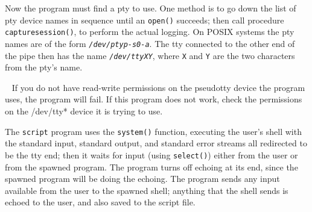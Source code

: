 Now the program must find a pty to use. One method is to go
down the list of pty device names in sequence until an
\texttt{open()} succeeds; then call procedure \texttt{capturesession()},
to perform the actual logging. On POSIX systems the pty
names are of the form \texttt{\textit{/dev/ptyp-s0-a}}. The tty
connected to the other end of the pipe then has the name
\texttt{\textit{/dev/ttyXY}}, where \texttt{X} and \texttt{Y} are the
two characters from the pty's name.



\medskip{}\ {\sffamily
If you do not have read-write permissions on the pseudotty device the
program uses, the program will fail. If this program does not work,
check the permissions on the /dev/tty* device it is trying to use. }\medskip

The \texttt{script} program uses the \texttt{system()}
function, executing the user's shell with the standard
input, standard output, and standard error streams all redirected to be
the tty end; then it waits for input (using
\texttt{select()}) either from the user or from the
spawned program. The program turns off echoing at its end, since the
spawned program will be doing the echoing. The program sends any input
available from the user to the spawned shell; anything that the shell
sends is echoed to the user, and also saved to the script file.

